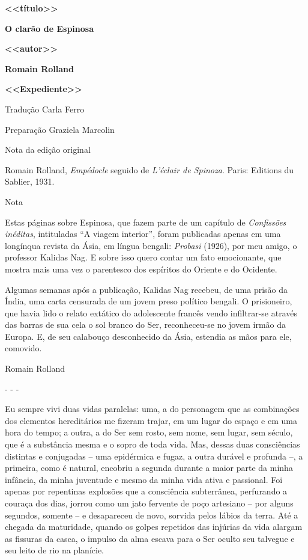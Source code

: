 \textbf{\textless{}\textless{}título\textgreater{}\textgreater{}}

\textbf{O clarão de Espinosa}

\textbf{\textless{}\textless{}autor\textgreater{}\textgreater{}}

\textbf{Romain Rolland}

\textbf{\textless{}\textless{}Expediente\textgreater{}\textgreater{}}

Tradução Carla Ferro

Preparação Graziela Marcolin

Nota da edição original

Romain Rolland, \emph{Empédocle} seguido de \emph{L'éclair de Spinoza}.
Paris: Editions du Sablier, 1931.

Nota

Estas páginas sobre Espinosa, que fazem parte de um capítulo de
\emph{Confissões inéditas}, intituladas ``A viagem interior'', foram
publicadas apenas em uma longínqua revista da Ásia, em língua bengali:
\emph{Probasi} (1926), por meu amigo, o professor Kalidas Nag. E sobre
isso quero contar um fato emocionante, que mostra mais uma vez o
parentesco dos espíritos do Oriente e do Ocidente.

Algumas semanas após a publicação, Kalidas Nag recebeu, de uma prisão da
Índia, uma carta censurada de um jovem preso político bengali. O
prisioneiro, que havia lido o relato extático do adolescente francês
vendo infiltrar-se através das barras de sua cela o sol branco do Ser,
reconheceu-se no jovem irmão da Europa. E, de seu calabouço desconhecido
da Ásia, estendia as mãos para ele, comovido.

Romain Rolland

- - -

Eu sempre vivi duas vidas paralelas: uma, a do personagem que as
combinações dos elementos hereditários me fizeram trajar, em um lugar do
espaço e em uma hora do tempo; a outra, a do Ser sem rosto, sem nome,
sem lugar, sem século, que é a substância mesma e o sopro de toda vida.
Mas, dessas duas consciências distintas e conjugadas -- uma epidérmica e
fugaz, a outra durável e profunda --, a primeira, como é natural,
encobriu a segunda durante a maior parte da minha infância, da minha
juventude e mesmo da minha vida ativa e passional. Foi apenas por
repentinas explosões que a consciência subterrânea, perfurando a couraça
dos dias, jorrou como um jato fervente de poço artesiano -- por alguns
segundos, somente -- e desapareceu de novo, sorvida pelos lábios da
terra. Até a chegada da maturidade, quando os golpes repetidos das
injúrias da vida alargam as fissuras da casca, o impulso da alma escava
para o Ser oculto seu talvegue e seu leito de rio na planície.

